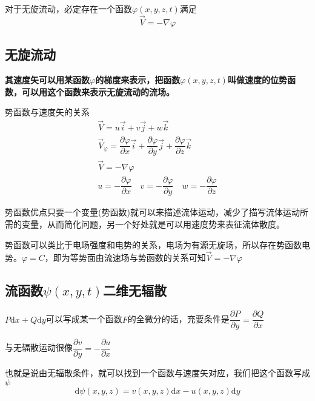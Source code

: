 \documentclass[a4paper,oneside]{ctexbook}
\begin{document}
对于无旋流动，必定存在一个函数\(\varphi(x,y,z,t)\)满足\begin{equation}\overrightarrow{V}=-\nabla\varphi\end{equation}

\subsection{无旋流动}

\textbf{其速度矢可以用某函数\(\varphi\)的梯度来表示，把函数\(\varphi(x,y,z,t)\)叫做速度的位势函数，可以用这个函数来表示无旋流动的流场。}

势函数与速度矢的关系
\begin{gather*}
    \overrightarrow{V}=u\overrightarrow{i}+v\overrightarrow{j}+w\overrightarrow{k}\\
    \overrightarrow{V}_\varphi=\dfrac{\partial\varphi}{\partial{x}}\overrightarrow{i}+\dfrac{\partial\varphi}{\partial{y}}\overrightarrow{j}+\dfrac{\partial\varphi}{\partial{z}}\overrightarrow{k}\\
    \overrightarrow{V}=-\nabla\varphi\\
    u=-\dfrac{\partial\varphi}{\partial{x}}\quad v=-\dfrac{\partial\varphi}{\partial{y}}\quad w=-\dfrac{\partial\varphi}{\partial{z}}
\end{gather*}

势函数优点只要一个变量(势函数)就可以来描述流体运动，减少了描写流体运动所需的变量，从而简化问题，另一个好处就是可以用速度势来表征流体散度。

势函数可以类比于电场强度和电势的关系，电场为有源无旋场，所以存在势函数电势。\(\varphi=C\)，即为等势面由流速场与势函数的关系可知\(\overrightarrow{V}=-\nabla\varphi\)

\subsection{流函数\(\psi(x,y,t)\)二维无辐散}

\(P\mathrm{d}x+Q\mathrm{d}y\)可以写成某一个函数\(F\)的全微分的话，充要条件是\(\dfrac{\partial{P}}{\partial{y}}=\dfrac{\partial{Q}}{\partial{x}}\)

与无辐散运动很像\(\dfrac{\partial{v}}{\partial{y}}=-\dfrac{\partial{u}}{\partial{x}}\)

也就是说由无辐散条件，就可以找到一个函数与速度矢对应，我们把这个函数写成\(\psi\)
\begin{equation}
    \mathrm{d}\psi(x,y,z)=v(x,y,z)\mathrm{d}x-u(x,y,z)\mathrm{d}y
\end{equation}
\end{document}
